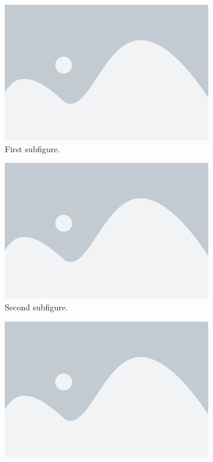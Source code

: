 \begin{figure}[ht]
  \centering
  \begin{subfigure}{0.4\textwidth}
    \includegraphics[width=\textwidth]{../images/fig1.png}
    \caption{First subfigure.}
    \label{fig:a-b-first}
  \end{subfigure}
  \hfill
  \begin{subfigure}{0.4\textwidth}
    \includegraphics[width=\textwidth]{../images/fig1.png}
    \caption{Second subfigure.}
    \label{fig:a-b-second}
  \end{subfigure}
  \hfill
  \begin{subfigure}{0.4\textwidth}
    \includegraphics[width=\textwidth]{../images/fig1.png}

\end{subfigure}
\end{figure}
